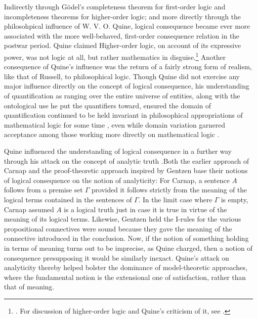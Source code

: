 	Indirectly through G\"{o}del's completeness theorem for first-order logic and incompleteness theorems for higher-order logic; and more directly through the philosohpical influence of W. V. O. Quine, logical consequence became ever more associated with the more well-behaved, first-order consequence relation in the postwar period. Quine claimed Higher-order logic, on account of its expressive power, was not logic at all, but rather mathematics in disguise.\footnote{\cite[ch. 5]{Quine1986}. For discussion of higher-order logic and Quine's criticism of it, see \cite{Shapiro2001}.} Another consequence of Quine's influence was the return of a fairly strong form of realism, like that of Russell, to philosophical logic. Though Quine did not exercise any major influence directly on the concept of logical consequence, his understanding of quantification as ranging over the entire universe of entities, along with the ontological use he put the quantifiers toward, ensured the domain of quantification continued to be held invariant in philosophical appropriations of mathematical logic for some time \cite[31-32]{Quine1948} \cite{Eder2016} \cite{Lewis1968}, even while domain variation garnered acceptance among those working more directly on mathematical logic \cite{Henkin1949} \cite{Kemeny1948} \cite{Kemeny1956} \cite{Tarski1953a}.
	
	Quine influenced the understanding of logical consequence in a further way through his attack on the concept of analytic truth \cite{Quine1951} \cite{Quine1960a}.Both the earlier approach of Carnap and the proof-theoretic approach inspired by Gentzen base their notions of logical consequence on the notion of analyticity: For Carnap, a sentence $A$ follows from a premise set $\Gamma$ provided it follows strictly from the meaning of the logical terms contained in the sentences of $\Gamma$. In the limit case where $\Gamma$ is empty, Carnap assumed $A$ is a logical truth just in case it is true in virtue of the meaning of its logical terms. Likewise, Gentzen held the I-rules for the various propositional connectives were sound because they gave the meaning of the connective introduced in the conclusion. Now, if the notion of something holding in terms of meaning turns out to be imprecise, as Quine charged, then a notion of consequence presupposing it would be similarly inexact. Quine's attack on analyticity thereby helped bolster the dominance of model-theoretic approaches, where the fundamental notion is the extensional one of satisfaction, rather than that of meaning.
	
